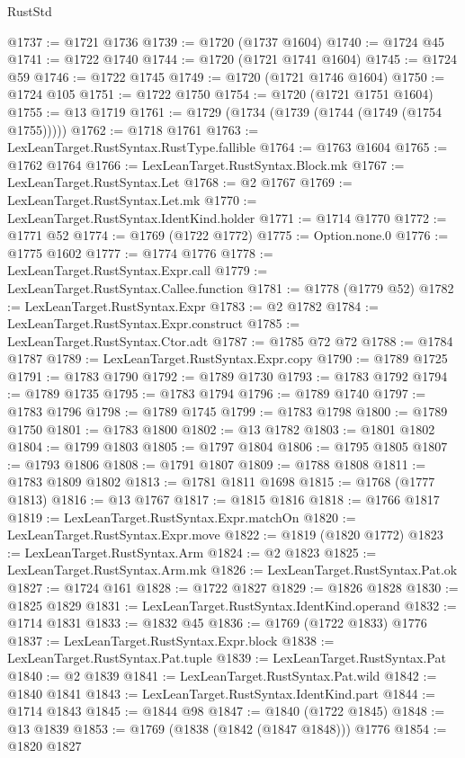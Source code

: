 \begin{lexlean}{RustStd}
\begin{coremodule}
@1737 := @1721 @1736
@1739 := @1720 (@1737 @1604)
@1740 := @1724 @45
@1741 := @1722 @1740
@1744 := @1720 (@1721 @1741 @1604)
@1745 := @1724 @59
@1746 := @1722 @1745
@1749 := @1720 (@1721 @1746 @1604)
@1750 := @1724 @105
@1751 := @1722 @1750
@1754 := @1720 (@1721 @1751 @1604)
@1755 := @13 @1719
@1761 := @1729 (@1734 (@1739 (@1744 (@1749 (@1754 @1755)))))
@1762 := @1718 @1761
@1763 := LexLeanTarget.RustSyntax.RustType.fallible
@1764 := @1763 @1604
@1765 := @1762 @1764
@1766 := LexLeanTarget.RustSyntax.Block.mk
@1767 := LexLeanTarget.RustSyntax.Let
@1768 := @2 @1767
@1769 := LexLeanTarget.RustSyntax.Let.mk
@1770 := LexLeanTarget.RustSyntax.IdentKind.holder
@1771 := @1714 @1770
@1772 := @1771 @52
@1774 := @1769 (@1722 @1772)
@1775 := Option.none.{0}
@1776 := @1775 @1602
@1777 := @1774 @1776
@1778 := LexLeanTarget.RustSyntax.Expr.call
@1779 := LexLeanTarget.RustSyntax.Callee.function
@1781 := @1778 (@1779 @52)
@1782 := LexLeanTarget.RustSyntax.Expr
@1783 := @2 @1782
@1784 := LexLeanTarget.RustSyntax.Expr.construct
@1785 := LexLeanTarget.RustSyntax.Ctor.adt
@1787 := @1785 @72 @72
@1788 := @1784 @1787
@1789 := LexLeanTarget.RustSyntax.Expr.copy
@1790 := @1789 @1725
@1791 := @1783 @1790
@1792 := @1789 @1730
@1793 := @1783 @1792
@1794 := @1789 @1735
@1795 := @1783 @1794
@1796 := @1789 @1740
@1797 := @1783 @1796
@1798 := @1789 @1745
@1799 := @1783 @1798
@1800 := @1789 @1750
@1801 := @1783 @1800
@1802 := @13 @1782
@1803 := @1801 @1802
@1804 := @1799 @1803
@1805 := @1797 @1804
@1806 := @1795 @1805
@1807 := @1793 @1806
@1808 := @1791 @1807
@1809 := @1788 @1808
@1811 := @1783 @1809 @1802
@1813 := @1781 @1811 @1698
@1815 := @1768 (@1777 @1813)
@1816 := @13 @1767
@1817 := @1815 @1816
@1818 := @1766 @1817
@1819 := LexLeanTarget.RustSyntax.Expr.matchOn
@1820 := LexLeanTarget.RustSyntax.Expr.move
@1822 := @1819 (@1820 @1772)
@1823 := LexLeanTarget.RustSyntax.Arm
@1824 := @2 @1823
@1825 := LexLeanTarget.RustSyntax.Arm.mk
@1826 := LexLeanTarget.RustSyntax.Pat.ok
@1827 := @1724 @161
@1828 := @1722 @1827
@1829 := @1826 @1828
@1830 := @1825 @1829
@1831 := LexLeanTarget.RustSyntax.IdentKind.operand
@1832 := @1714 @1831
@1833 := @1832 @45
@1836 := @1769 (@1722 @1833) @1776
@1837 := LexLeanTarget.RustSyntax.Expr.block
@1838 := LexLeanTarget.RustSyntax.Pat.tuple
@1839 := LexLeanTarget.RustSyntax.Pat
@1840 := @2 @1839
@1841 := LexLeanTarget.RustSyntax.Pat.wild
@1842 := @1840 @1841
@1843 := LexLeanTarget.RustSyntax.IdentKind.part
@1844 := @1714 @1843
@1845 := @1844 @98
@1847 := @1840 (@1722 @1845)
@1848 := @13 @1839
@1853 := @1769 (@1838 (@1842 (@1847 @1848))) @1776
@1854 := @1820 @1827

\end{coremodule}
\end{lexlean}
